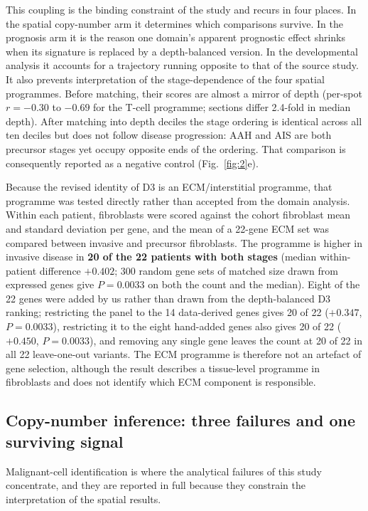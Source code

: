 This coupling is the binding constraint of the study and recurs in four places. In the
spatial copy-number arm it determines which comparisons survive. In the prognosis arm it is
the reason one domain's apparent prognostic effect shrinks when its signature is replaced by
a depth-balanced version. In the developmental analysis it accounts for a trajectory running
opposite to that of the source study. It also prevents interpretation of the
stage-dependence of the four spatial programmes. Before matching, their scores are almost a
mirror of depth (per-spot $r=-0.30$ to $-0.69$ for the T-cell programme; sections differ
2.4-fold in median depth). After matching into depth deciles the stage ordering is identical
across all ten deciles but does not follow disease progression: AAH and AIS are both
precursor stages yet occupy opposite ends of the ordering. That comparison is consequently
reported as a negative control (Fig.~\ref{fig:2}e).

Because the revised identity of D3 is an ECM/interstitial programme, that programme was
tested directly rather than accepted from the domain analysis. Within each patient,
fibroblasts were scored against the cohort fibroblast mean and standard deviation per gene,
and the mean of a 22-gene ECM set was compared between invasive and precursor fibroblasts.
The programme is higher in invasive disease in \textbf{20 of the 22 patients with both
stages} (median within-patient difference $+0.402$; 300 random gene sets of matched size
drawn from expressed genes give $P=0.0033$ on both the count and the median). Eight of the
22 genes were added by us rather than drawn from the depth-balanced D3 ranking; restricting
the panel to the 14 data-derived genes gives 20 of 22 ($+0.347$, $P=0.0033$), restricting it
to the eight hand-added genes also gives 20 of 22 ($+0.450$, $P=0.0033$), and removing any
single gene leaves the count at 20 of 22 in all 22 leave-one-out variants. The ECM programme
is therefore not an artefact of gene selection, although the result describes a tissue-level
programme in fibroblasts and does not identify which ECM component is responsible.

\subsection{Copy-number inference: three failures and one surviving signal}

Malignant-cell identification is where the analytical failures of this study concentrate,
and they are reported in full because they constrain the interpretation of the spatial
results.

